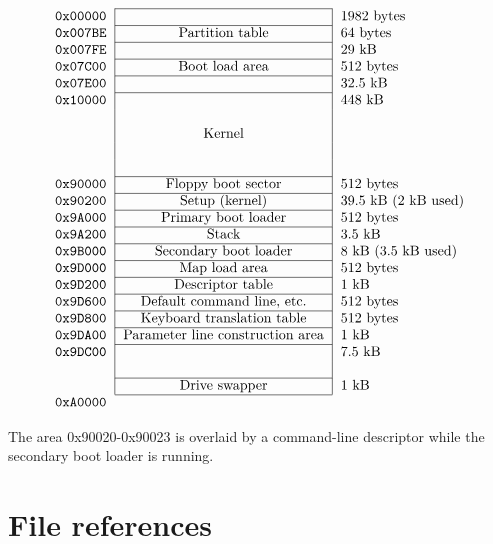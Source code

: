 $$
\begin{tabular}{l|c|l}
  \cline{2-2}
  \tt 0x00000 & & 1982 bytes \\
  \cline{2-2}
  \tt 0x007BE & Partition table & 64 bytes \\
  \cline{2-2}
  \tt 0x007FE & & 29 kB \\
  \cline{2-2}
  \tt 0x07C00 & Boot load area & 512 bytes \\
  \cline{2-2}
  \tt 0x07E00 & & 32.5 kB \\
  \cline{2-2}
  \tt 0x10000 & & 448 kB \\
  & & \\
  & Kernel & \\
  & & \\
  & & \\
  \cline{2-2}
  \tt 0x90000 & Floppy boot sector & 512 bytes \\
  \cline{2-2}
  \tt 0x90200 & Setup (kernel) & 39.5 kB (2 kB used) \\
  \cline{2-2}
  \tt 0x9A000 & Primary boot loader & 512 bytes \\
  \cline{2-2}
  \tt 0x9A200 & Stack & 3.5 kB \\
  \cline{2-2}
  \tt 0x9B000 & Secondary boot loader & 8 kB (3.5 kB used) \\
  \cline{2-2}
  \tt 0x9D000 & Map load area & 512 bytes \\
  \cline{2-2}
  \tt 0x9D200 & Descriptor table & 1 kB \\
  \cline{2-2}
  \tt 0x9D600 & Default command line, etc. & 512 bytes \\
  \cline{2-2}
  \tt 0x9D800 & Keyboard translation table & 512 bytes \\
  \cline{2-2}
  \tt 0x9DA00 & Parameter line construction area & 1 kB \\
  \cline{2-2}
  \tt 0x9DC00 & & 7.5 kB \\
  & & \\
  \cline{2-2}
  & Drive swapper & 1 kB \\
  \cline{2-2}
  \multicolumn{3}{l}{\tt 0xA0000} \\
\end{tabular}
$$

The area 0x90020-0x90023 is overlaid by a command-line descriptor while
the secondary boot loader is running.



\section{File references}

